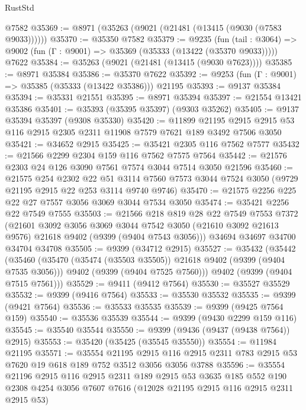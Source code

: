 \begin{lexlean}{RustStd}
\begin{coremodule}
    @7582
@35369 := @8971 (@35263 (@9021 (@21481 (@13415 (@9030 (@7583 @9033))))))
@35370 := @35350 @7582
@35379 := @9235
    (fun (tail : @3064) => @9002 (fun (Γ : @9001) => @35369 (@35333 (@13422 (@35370 @9033)))))
    @7622
@35384 := @35263 (@9021 (@21481 (@13415 (@9030 @7623))))
@35385 := @8971 @35384
@35386 := @35370 @7622
@35392 := @9253 (fun (Γ : @9001) => @35385 (@35333 (@13422 @35386))) @21195
@35393 := @9137 @35384
@35394 := @35331 @21551
@35395 := @8971 @35394
@35397 := @21554 @13421 @35386
@35401 := @35393 (@35395 @35397) (@9303 @35262)
@35405 := @9137 @35394 @35397 (@9308 @35330)
@35420 := @11899
    @21195
    @2915
    @2915
    @53
    @116
    @2915
    @2305
    @2311
    @11908
    @7579
    @7621
    @189
    @3492
    @7506
    @3050
@35421 := @34652 @2915
@35425 := @35421 @2305 @116 @7562 @7577
@35432 := @21566 @2299 @2304 @159 @116 @7562 @7575 @7564
@35442 := @21576 @2303 @24 @126 @3090 @7561 @7574 @3044 @7514 @3050 @21596
@35460 := @21575
    @254
    @2302
    @22
    @51
    @3114
    @7560
    @7573
    @3044
    @7524
    @3050
    (@9729 @21195 @2915 @22 @253 @3114 @9740 @9746)
@35470 := @21575 @2256 @225 @22 @27 @7557 @3056 @3069 @3044 @7534 @3050
@35474 := @35421 @2256 @22 @7549 @7555
@35503 := @21566
    @218
    @819
    @28
    @22
    @7549
    @7553
    @7372
    (@21601
      @3092
      @3056
      @3069
      @3044
      @7542
      @3050
      (@21610 @3092 @21613 @9576)
      @21618
      @9402
      (@9399 (@9404 @7543 @3056)))
    @34694
    @34697
    @34700
    @34704
    @34708
@35505 := @9399 (@34712 @2915)
@35527 := @35432
    (@35442
      (@35460
        (@35470 (@35474 (@35503 @35505)) @21618 @9402 (@9399 (@9404 @7535 @3056)))
        @9402
        (@9399 (@9404 @7525 @7560)))
      @9402
      (@9399 (@9404 @7515 @7561)))
@35529 := @9411 (@9412 @7564)
@35530 := @35527 @35529
@35532 := @9399 (@9416 @7564)
@35533 := @35530 @35532
@35535 := @9399 (@9421 @7564)
@35536 := @35533 @35535
@35539 := @9399 (@9425 @7564 @159)
@35540 := @35536 @35539
@35544 := @9399 (@9430 @2299 @159 @116)
@35545 := @35540 @35544
@35550 := @9399 (@9436 (@9437 (@9438 @7564)) @2915)
@35553 := @35420 (@35425 (@35545 @35550))
@35554 := @11984 @21195
@35571 := @35554
    @21195
    @2915
    @116
    @2915
    @2311
    @783
    @2915
    @53
    @7620
    @19
    @618
    @189
    @752
    @3512
    @3056
    @3056
    @3788
@35596 := @35554
    @21196
    @2915
    @116
    @2915
    @2311
    @189
    @2915
    @53
    @3635
    @185
    @552
    @190
    @2308
    @4254
    @3056
    @7607
    @7616
    (@12028 @21195 @2915 @116 @2915 @2311 @2915 @53)

\end{coremodule}
\end{lexlean}

